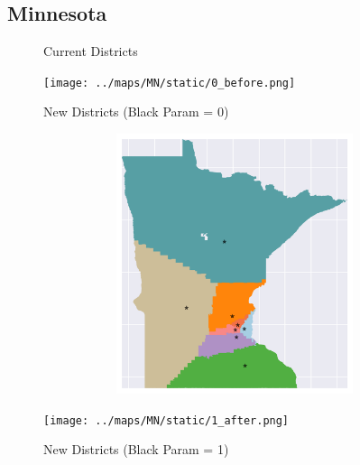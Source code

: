 \subsection{Minnesota}
\begin{figure}[htb!] \centering
\caption{ Current Districts }
\texttt{[image: ../maps/MN/static/0\_before.png]}
\caption{ New Districts (Black Param = 0) }
\includegraphics[width=5in,height=3in,keepaspectratio]{../maps/MN/static/0_after.png}
\caption{ New Districts (Black Param = 1) }
\texttt{[image: ../maps/MN/static/1\_after.png]}
\end{figure}

\clearpage
\newpage

